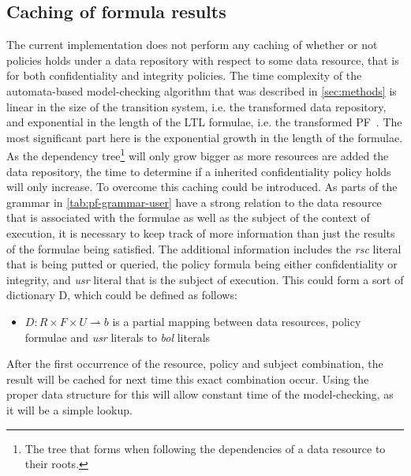 \subsection{Caching of formula results}\label{sec:cache}
The current implementation does not perform any caching of whether or not policies holds under a data repository with respect to some data resource, that is for both confidentiality and integrity policies. The time complexity of the automata-based model-checking algorithm that was described in \autoref{sec:methods} is linear in the size of the transition system, i.e. the transformed data repository, and exponential in the length of the LTL formulae, i.e. the transformed PF~\cite{baier2008principles}. The most significant part here is the exponential growth in the length of the formulae. As the dependency tree\footnote{The tree that forms when following the dependencies of a data resource to their roots.} will only grow bigger as more resources are added the data repository, the time to determine if a inherited confidentiality policy holds will only increase. To overcome this caching could be introduced. As parts of the grammar in \autoref{tab:pf-grammar-user} have a strong relation to the data resource that is associated with the formulae as well as the subject of the context of execution, it is necessary to keep track of more information than just the results of the formulae being satisfied. The additional information includes the \emph{rsc} literal that is being putted or queried, the policy formula being either confidentiality or integrity, and \emph{usr} literal that is the subject of execution. This could form a sort of dictionary D, which could be defined as follows:
\begin{itemize}
    \item $D : R \times F \times U \rightharpoonup b$ is a partial mapping between data resources, policy formulae and \emph{usr} literals to \emph{bol} literals
\end{itemize}
After the first occurrence of the resource, policy and subject combination, the result will be cached for next time this exact combination occur. Using the proper data structure for this will allow constant time of the model-checking, as it will be a simple lookup.

